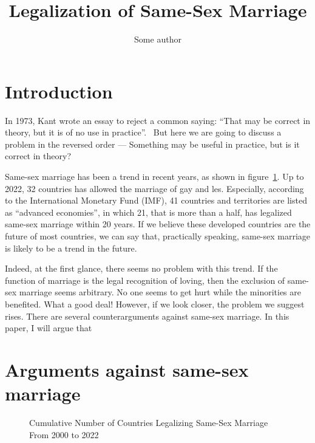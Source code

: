 \documentclass{article}
\title{Legalization of Same-Sex Marriage}
\author{Some author}
\begin{document}
\maketitle

\tableofcontents

\section{Introduction}
In 1973, Kant wrote an essay to reject a common saying: ``That may be correct in theory, but it is of no use in practice''.~\autocite{kantCommonSayingThat2009} But here we are going to discuss a problem in the reversed order --- Something may be useful in practice, but is it correct in theory? 

Same-sex marriage has been a trend in recent years, as shown in figure~\ref{Cumu}. Up to 2022, 32 countries has allowed the marriage of gay and les. Especially, according to the International Monetary Fund (IMF), 41 countries and territories are listed as ``advanced economies'', in which 21, that is more than a half, has legalized same-sex marriage within 20 years. If we believe these developed countries are the future of most countries, we can say that, practically speaking, same-sex marriage is likely to be a trend in the future.

Indeed, at the first glance, there seems no problem with this trend. If the function of marriage is the legal recognition of loving, then the exclusion of same-sex marriage seems arbitrary. No one seems to get hurt while the minorities are benefited. What a good deal! However, if we look closer, the problem we suggest rises. There are several counterarguments against same-sex marriage. In this paper, I will argue that 

\section{Arguments against same-sex marriage}




\begin{figure}[H]
\centering
{}
    
\caption{Cumulative Number of Countries Legalizing Same-Sex Marriage From 2000 to 2022~\autocite{perper32CountriesWorld2022}}
\label{Cumu}
\end{figure}


\printbibliography{}
\end{document}
